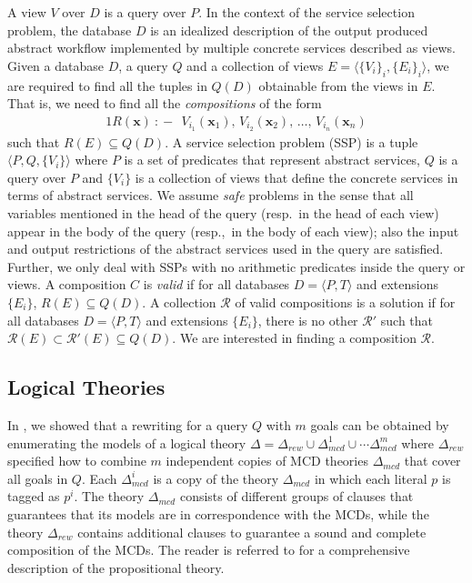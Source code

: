 \documentclass{article}
\newcommand{\tup}[1]{\langle #1 \rangle}
\newcommand{\vvec}[1]{\mathbf{#1}}
\newcommand{\R}{\mathcal{R}}
\newcommand{\qrule}{:\!\!-}
\begin{document}
{A view $V$ over $D$ is a query over $P$. In the context of the service selection problem, 
the database $D$ is an idealized description of 
the output produced abstract workflow  implemented by multiple concrete services described
as views.
Given a database $D$, a query $Q$ and a collection of 
views $E=\tup{\{V_i\}_i,\{E_i\}_i}$, we are required to find
all the tuples in $Q(D)$ obtainable from the views in $E$.
That is, we need to find all the \emph{compositions} of the form
\begin{alignat*}{1}
R(\vvec{x})\ \qrule\ \ V_{i_1}(\vvec{x}_1),\, V_{i_2}(\vvec{x}_2),\, \ldots,\, V_{i_n}(\vvec{x}_n)
\end{alignat*}
such that $R(E) \subseteq Q(D)$.
A service selection problem (SSP) is a tuple $\tup{P,Q,\{V_i\}}$ where $P$
is a set of predicates that represent abstract services, $Q$ is a query over $P$ and $\{V_i\}$ is a collection of views that define the concrete services in terms of  abstract services. We assume \emph{safe} problems in the sense that all 
variables mentioned in the head of the query (resp.\ in the head of each view)
appear in the body of the query (resp.,\ in the body of each view); also the input and output restrictions of the abstract services used in the query are satisfied.
Further, we only deal with SSPs with no arithmetic predicates inside the
query or views.
A composition $C$ is \emph{valid} if for all databases $D=\tup{P,T}$
and extensions $\{E_i\}$, $R(E) \subseteq Q(D)$.
A collection $\R$ of valid compositions is a solution if
for all databases $D=\tup{P,T}$ and extensions $\{E_i\}$, there
is no other $\R'$ such that $\R(E)\subset\R'(E)\subseteq Q(D)$.
We are interested in finding a composition $\R$.

\subsection{Logical Theories}

In \cite{arvelo:aaai06}, we showed that a rewriting
for a query $Q$ with $m$ goals can be obtained by enumerating the
models of a logical theory
$\Delta=\Delta_{rew}\cup\Delta_{mcd}^1\cup\cdots\Delta_{mcd}^m$
where $\Delta_{rew}$ specified how to combine $m$ independent
copies of MCD theories $\Delta_{mcd}$ that cover all goals in $Q$.
Each $\Delta^i_{mcd}$ is a copy of the theory $\Delta_{mcd}$
in which each literal $p$ is tagged as $p^i$.
The theory $\Delta_{mcd}$ consists of different groups of 
clauses that guarantees that its models are in correspondence
with the MCDs, while the theory $\Delta_{rew}$ contains additional
clauses to guarantee a sound and complete composition of the MCDs.
The reader is referred to \cite{arvelo:aaai06} for a comprehensive
description of the propositional theory.

}
\end{document}
